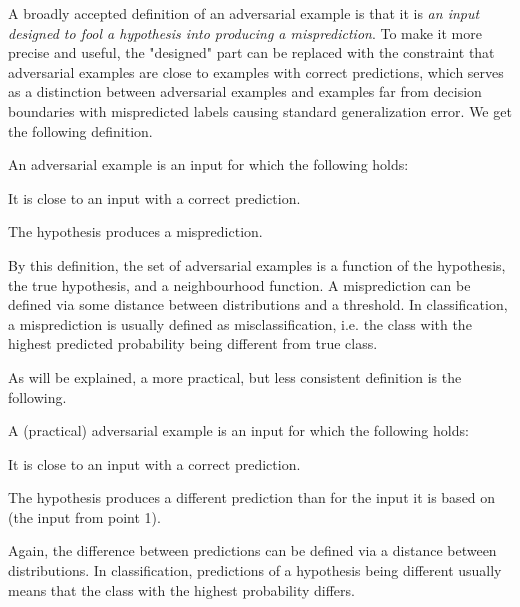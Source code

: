 \documentclass[conference,compsoc]{IEEEtran}
\begin{document}
A broadly accepted definition of an adversarial example is that it is \textit{an input designed to fool a hypothesis into producing a misprediction}. To make it more precise and useful, the "designed" part can be replaced with the constraint that adversarial examples are close to examples with correct predictions, which serves as a distinction between adversarial examples and examples far from decision boundaries with mispredicted labels causing standard generalization error. We get the following definition.
\begin{definition} \label{def:ae-consistent}
	An adversarial example is an input for which the following holds:
	\begin{solidenumerate}
		\item It is close to an input with a correct prediction.
		\item The hypothesis produces a misprediction.
	\end{solidenumerate}
\end{definition}
By this definition, the set of adversarial examples is a function of the hypothesis, the true hypothesis, and a neighbourhood function. A misprediction can be defined via some distance between distributions and a threshold. In classification, a misprediction is usually defined as misclassification, i.e. the class with the highest predicted probability being different from true class.

As will be explained, a more practical, but less consistent definition is the following. 
\begin{definition} \label{def:ae-practical}
	A (practical) adversarial example is an input for which the following holds:
	\begin{solidenumerate}
		\item It is close to an input with a correct prediction.
		\item The hypothesis produces a different prediction than for the input it is based on (the input from point 1).
	\end{solidenumerate}
\end{definition}
Again, the difference between predictions can be defined via a distance between distributions.	
In classification, predictions of a hypothesis being different usually means that the class with the highest probability differs.
\end{document}

